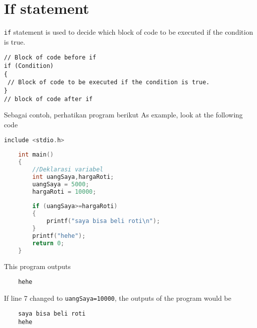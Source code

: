 \section{If statement}
\verb*|if| statement is used to decide which block of code to be executed if the condition is true.
\begin{verbatim}
// Block of code before if
if (Condition) 
{
 // Block of code to be executed if the condition is true.
}
// block of code after if
\end{verbatim}
Sebagai contoh, perhatikan program berikut
As example, look at the following code 
\begin{lstlisting}[language=c,caption = If statement example,label=lst:ifexample01]
	include <stdio.h>
	
	int main()
	{
		//Deklarasi variabel 
		int uangSaya,hargaRoti;
		uangSaya = 5000;
		hargaRoti = 10000;
		
		if (uangSaya>=hargaRoti)
		{
		    printf("saya bisa beli roti\n");
		}
		printf("hehe");
		return 0;
	}
\end{lstlisting}                        
This program outputs
\begin{verbatim}
    hehe
\end{verbatim}
If line 7 changed to \verb|uangSaya=10000|, the outputs of the program would be
\begin{verbatim}
    saya bisa beli roti
    hehe
\end{verbatim}

